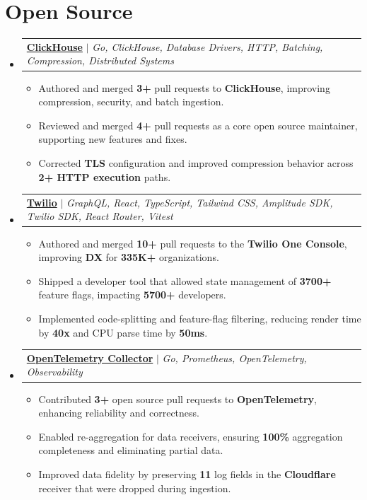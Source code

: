 \documentclass[letterpaper,11pt]{article}
\makeatletter
\newcommand{\resumeItem}[1]{
  \item\small{
    {#1 \vspace{-2pt}}
  }
}
\newcommand{\resumeProjectHeading}[2]{
    \item
    \begin{tabular*}{0.97\textwidth}{l@{\extracolsep{\fill}}r}
      \small#1\\
    \end{tabular*}\vspace{-7pt}
}
\newcommand{\resumeSubHeadingListStart}{\begin{itemize}[leftmargin=0.15in, label={}]}
\newcommand{\resumeSubHeadingListEnd}{\end{itemize}}
\newcommand{\resumeItemListStart}{\begin{itemize}}
\newcommand{\resumeItemListEnd}{\end{itemize}\vspace{-7pt}}
\makeatother
\begin{document}
\section{Open Source 
}
    \resumeSubHeadingListStart
      \resumeProjectHeading
        {\textbf{{\ul{ClickHouse}}} $|$ \emph{Go, ClickHouse, Database Drivers, HTTP, Batching, Compression, Distributed Systems}}{June 2021 -- Present}
          \resumeItemListStart
            \resumeItem{Authored and merged \textbf{3+} pull requests to \textbf{ClickHouse}, improving compression, security, and batch ingestion.}
            \resumeItem{Reviewed and merged \textbf{4+} pull requests as a core open source maintainer, supporting new features and fixes.}
            \resumeItem{Corrected \textbf{TLS} configuration and improved compression behavior across \textbf{2+ HTTP execution} paths.}
          \resumeItemListEnd
        \resumeProjectHeading
        {\textbf{{\ul{Twilio}}} $|$ \emph{GraphQL, React, TypeScript, Tailwind CSS, Amplitude SDK, Twilio SDK, React Router, Vitest}}{June 2021 -- Present}
            \resumeItemListStart
            \resumeItem{Authored and merged \textbf{10+} pull requests to the \textbf{Twilio One Console}, improving \textbf{DX} for \textbf{335K+} organizations.}
            \resumeItem{Shipped a developer tool that allowed state management of \textbf{3700+} feature flags, impacting \textbf{5700+} developers.}
            \resumeItem{Implemented code-splitting and feature-flag filtering, reducing render time by \textbf{40x} and CPU parse time by \textbf{50ms}.}
        \resumeItemListEnd
      \resumeProjectHeading
        {\textbf{{\underline{OpenTelemetry Collector}}} $|$ \emph{Go, Prometheus, OpenTelemetry, Observability}}{June 2021 -- Present}
          \resumeItemListStart
            \resumeItem{Contributed \textbf{3+} open source pull requests to \textbf{OpenTelemetry}, enhancing reliability and correctness.}
            \resumeItem{Enabled re-aggregation for data receivers, ensuring \textbf{100\%} aggregation completeness and eliminating partial data.}
            \resumeItem{Improved data fidelity by preserving \textbf{11} log fields in the \textbf{Cloudflare} receiver that were dropped during ingestion.}
          \resumeItemListEnd
      
      
      
      
      
      
    \resumeSubHeadingListEnd


  
\end{document}
